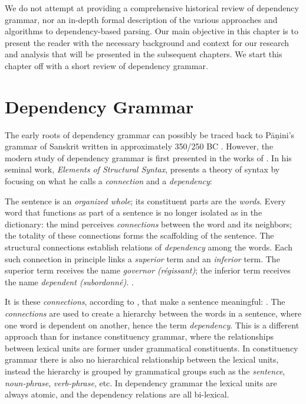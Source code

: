 We do not attempt at providing a comprehensive historical review of dependency grammar, nor an in-depth formal description of the various approaches and algorithms to dependency-based parsing. Our main objective in this chapter is to present the reader with the necessary background and context for our research and analysis that will be presented in the subsequent chapters. We start this chapter off with a short review of dependency grammar.

\section{Dependency Grammar}
\label{grammar}

The early roots of dependency grammar can possibly be traced back to P\={a}\d{n}ini's grammar of Sanskrit written in approximately 350/250 BC \cite{Kruijff:02}. However, the modern study of  dependency grammar is first presented in the works of \citeauthor{Tes:15}. In his seminal work, \textit{Elements of Structural Syntax}, \citeauthor{Tes:15} presents a theory of syntax by focusing on what he calls a \textit{connection} and a \textit{dependency}:

\begin{displayquote}
The sentence is an \textit{organized whole}; its constituent parts are the \textit{words}. Every word that functions as part of a sentence is no longer isolated as in the dictionary: the mind perceives \textit{connections} between the word and its neighbors; the totality of these connections forms the scaffolding of the sentence. The structural connections establish relations of \textit{dependency} among the words. Each such connection in principle links a \textit{superior} term and an \textit{inferior} term. The superior term receives the name \textit{governor (r\'{e}gissant)}; the inferior term receives the name \textit{dependent (subordonn\'{e})}. \cite{Tes:15}.
\end{displayquote}

It is these \textit{connections}, according to \citeauthor{Tes:15}, that make a sentence meaningful:  \cite{Tes:15}. The \textit{connections} are used to create a hierarchy between the words in a sentence, where one word is dependent on another, hence the term \textit{dependency}. This is a different approach than for instance constituency grammar, where the relationships between lexical units are former under grammatical constituents. In constituency grammar there is also no hierarchical relationship between the lexical units, instead the hierarchy is grouped by grammatical groups such as the \textit{sentence}, \textit{noun-phrase}, \textit{verb-phrase}, etc. In dependency grammar the lexical units are always atomic, and the dependency relations are all bi-lexical. 

